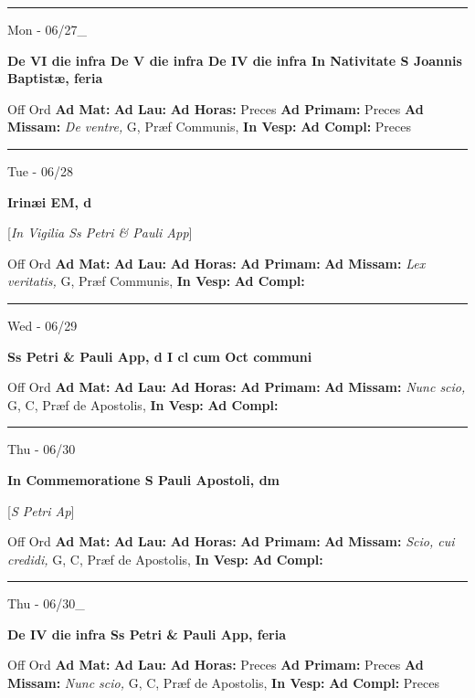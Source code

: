 \documentclass[letterpaper, 10pt]{article}
\begin{document}
\hrule
\begin{center}
Mon - 06/27\_
\end{center}\textbf{ \large De VI die infra De V die infra De IV die infra In Nativitate S Joannis Baptistæ, \textnormal{\normalsize feria}}
\begin{justify}
Off Ord
\textbf{Ad Mat: }
\textbf{Ad Lau: }
\textbf{Ad Horas: }Preces
\textbf{Ad Primam: }Preces
\textbf{Ad Missam:} \textit{De ventre, } G, Præf Communis, 
\textbf{In Vesp: }
\textbf{Ad Compl: }Preces\end{justify}



\hrule
\begin{center}
Tue - 06/28
\end{center}\textbf{ \large Irinæi EM, \textnormal{\normalsize d}}

[\textit{In Vigilia Ss Petri \& Pauli App}]
\begin{justify}
Off Ord
\textbf{Ad Mat: }
\textbf{Ad Lau: }
\textbf{Ad Horas: }
\textbf{Ad Primam: }
\textbf{Ad Missam:} \textit{Lex veritatis, } G, Præf Communis, 
\textbf{In Vesp: }
\textbf{Ad Compl: }\end{justify}



\hrule
\begin{center}
Wed - 06/29
\end{center}\textbf{ \large Ss Petri \& Pauli App, \textnormal{\normalsize d I cl cum Oct communi}}
\begin{justify}
Off Ord
\textbf{Ad Mat: }
\textbf{Ad Lau: }
\textbf{Ad Horas: }
\textbf{Ad Primam: }
\textbf{Ad Missam:} \textit{Nunc scio, } G, C, Præf de Apostolis, 
\textbf{In Vesp: }
\textbf{Ad Compl: }\end{justify}



\hrule
\begin{center}
Thu - 06/30
\end{center}\textbf{ \large In Commemoratione S Pauli Apostoli, \textnormal{\normalsize dm}}

[\textit{S Petri Ap}]
\begin{justify}
Off Ord
\textbf{Ad Mat: }
\textbf{Ad Lau: }
\textbf{Ad Horas: }
\textbf{Ad Primam: }
\textbf{Ad Missam:} \textit{Scio, cui credidi, } G, C, Præf de Apostolis, 
\textbf{In Vesp: }
\textbf{Ad Compl: }\end{justify}



\hrule
\begin{center}
Thu - 06/30\_
\end{center}\textbf{ \large De IV die infra Ss Petri \& Pauli App, \textnormal{\normalsize feria}}
\begin{justify}
Off Ord
\textbf{Ad Mat: }
\textbf{Ad Lau: }
\textbf{Ad Horas: }Preces
\textbf{Ad Primam: }Preces
\textbf{Ad Missam:} \textit{Nunc scio, } G, C, Præf de Apostolis, 
\textbf{In Vesp: }
\textbf{Ad Compl: }Preces\end{justify}
\end{document}

